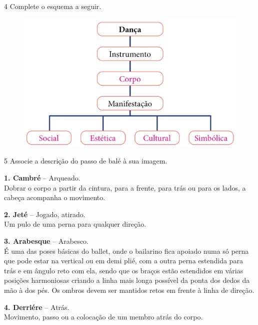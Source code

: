 
\pagebreak
\num{4}  Complete o esquema a seguir.

\begin{figure}[htpb!]
\includegraphics[width=\textwidth]{../ilustracoes/ART5/SAEB_5ANO_ART_FIGURA12.png}
\end{figure}


\num{5}  Associe a descrição do passo de balé à sua imagem.

\begin{mdframed}[linewidth=2pt,linecolor=salmao,backgroundcolor=salmao!20]
\textbf{1. Cambré} – Arqueado.\\
Dobrar o corpo a partir da cintura, para a frente, para trás ou para os
lados, a cabeça acompanha o movimento.

\bigskip
\noindent\textbf{2. Jeté} – Jogado, atirado.\\
Um pulo de uma perna para qualquer direção.

\bigskip
\noindent\textbf{3. Arabesque} – Arabesco.\\
É uma das poses básicas do ballet, onde o bailarino fica apoiado numa só
perna que pode estar na vertical ou em demi plié, com a outra perna
estendida para trás e em ângulo reto com ela, sendo que os braços estão
estendidos em várias posições harmoniosas criando a linha mais longa
possível da ponta dos dedos da mão à dos pés. Os ombros devem ser
mantidos retos em frente à linha de direção.

\bigskip
\noindent\textbf{4. Derriére} – Atrás.\\
Movimento, passo ou a colocação de um membro atrás do corpo.
\end{mdframed}

